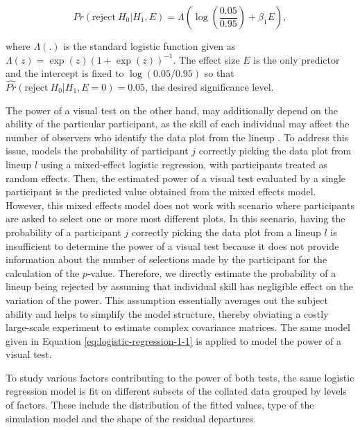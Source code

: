 \documentclass[]{interact}
\theoremstyle{plain}%
\theoremstyle{definition}
\theoremstyle{remark}
\begin{document}
\vspace{-\baselineskip}

\begin{equation} \label{eq:logistic-regression-1-1}
Pr(\text{reject}~H_0|H_1,E) = \Lambda\left(\log\left(\frac{0.05}{0.95}\right) + \beta_1 E\right),
\end{equation}

\noindent where \(\Lambda(.)\) is the standard logistic function given
as \(\Lambda(z) = \exp(z)(1+\exp(z))^{-1}\). The effect size \(E\) is
the only predictor and the intercept is fixed to \(\log(0.05/0.95)\) so
that \(\hat{Pr}(\text{reject}~H_0|H_1,E = 0) = 0.05\), the desired
significance level.

The power of a visual test on the other hand, may additionally depend on
the ability of the particular participant, as the skill of each
individual may affect the number of observers who identify the data plot
from the lineup \citep{majumder2013validation}. To address this issue,
\citet{majumder2013validation} models the probability of participant
\(j\) correctly picking the data plot from lineup \(l\) using a
mixed-effect logistic regression, with participants treated as random
effects. Then, the estimated power of a visual test evaluated by a
single participant is the predicted value obtained from the mixed
effects model. However, this mixed effects model does not work with
scenario where participants are asked to select one or more most
different plots. In this scenario, having the probability of a
participant \(j\) correctly picking the data plot from a lineup \(l\) is
insufficient to determine the power of a visual test because it does not
provide information about the number of selections made by the
participant for the calculation of the \(p\)-value. Therefore, we
directly estimate the probability of a lineup being rejected by assuming
that individual skill has negligible effect on the variation of the
power. This assumption essentially averages out the subject ability and
helps to simplify the model structure, thereby obviating a costly
large-scale experiment to estimate complex covariance matrices. The same
model given in Equation \ref{eq:logistic-regression-1-1} is applied to
model the power of a visual test.

To study various factors contributing to the power of both tests, the
same logistic regression model is fit on different subsets of the
collated data grouped by levels of factors. These include the
distribution of the fitted values, type of the simulation model and the
shape of the residual departures.
\end{document}
